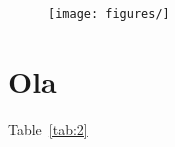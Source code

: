 \begin{figure}
  \begin{center}
    \texttt{[image: figures/]}
  \end{center}
  \caption{}
  \label{fig:}
\end{figure}

\section{Ola}

\newline

Table~\ref{tab:2}
